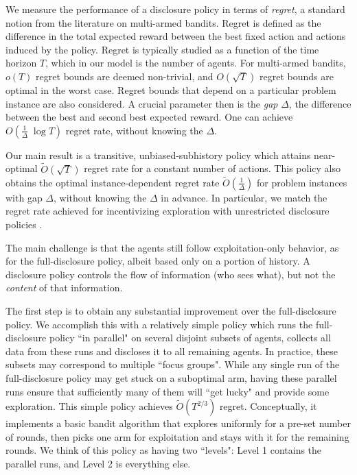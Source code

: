 We measure the performance of a disclosure policy in terms of \emph{regret}, a standard notion from the literature on multi-armed bandits. Regret is defined as the difference in the total expected reward between the best fixed action and actions induced by the policy. Regret is typically studied as a function of the time horizon $T$, which in our model is the number of agents. For multi-armed bandits, $o(T)$ regret bounds are deemed non-trivial, and $O(\sqrt{T})$ regret bounds are optimal in the worst case. Regret bounds that depend on a particular problem instance are also considered. A crucial parameter then is the \emph{gap} $\Delta$, the difference between the best and second best expected reward. One can achieve $O(\tfrac{1}{\Delta}\; \log T)$ regret rate, without knowing the $\Delta$.

Our main result is a transitive, unbiased-subhistory policy which attains near-optimal $\tilde{O}(\sqrt{T})$ regret rate for a constant number of actions. This policy also obtains the optimal instance-dependent regret rate
    $\tilde{O}(\tfrac{1}{\Delta})$
for problem instances with gap $\Delta$, without knowing the $\Delta$ in advance. In particular, we match the regret rate achieved for incentivizing exploration with unrestricted disclosure policies \citep{ICexploration-ec15-working}.

The main challenge is that the agents still follow exploitation-only behavior, as for the full-disclosure policy, albeit based only on a portion of history. A disclosure policy controls the flow of information (who sees what), but not the \emph{content} of that information.

The first step is to obtain any substantial improvement over the full-disclosure policy. We accomplish this with a relatively simple policy which runs the full-disclosure policy ``in parallel" on several disjoint subsets of agents,  collects all data from these runs and discloses it to all remaining agents. In practice, these subsets may correspond to multiple ``focus groups". While any single run of the full-disclosure policy may get stuck on a suboptimal arm, having these parallel runs ensure that sufficiently many of them will ``get lucky" and provide some exploration. This simple policy achieves $\tilde{O}(T^{2/3})$ regret. Conceptually, it implements a basic bandit algorithm that explores uniformly for a pre-set number of rounds, then picks one arm for exploitation and stays with it for the remaining rounds. We think of this policy  as having two ``levels": Level 1 contains the parallel runs, and Level 2 is everything else.

